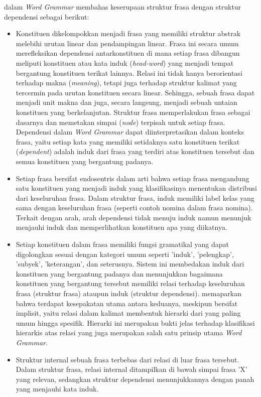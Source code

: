 \cite{hudson2010introduction} dalam \textit{Word Grammar} membahas keserupaan struktur frasa dengan struktur dependensi sebagai berikut:
\begin{itemize}
\item Konstituen dikelompokkan menjadi frasa yang memiliki struktur abstrak melebihi urutan linear dan pendampingan linear. Frasa ini secara umum merefleksikan dependensi antarkonstituen di mana setiap frasa dibangun meliputi konstituen atau kata induk (\textit{head-word}) yang menjadi tempat bergantung konstituen terikat lainnya. Relasi ini tidak hanya berorientasi terhadap makna (\textit{meaning}), tetapi juga terhadap struktur kalimat yang tercermin pada urutan konstituen secara linear. Sehingga, sebuah frasa dapat menjadi unit makna dan juga, secara langsung, menjadi sebuah untaian konstituen yang berkelanjutan. Struktur frasa memperlakukan frasa sebagai dasarnya dan memetakan simpai (\textit{node}) terpisah untuk setiap frasa. Dependensi dalam \textit{Word Grammar} dapat diinterpretasikan dalam konteks frasa, yaitu setiap kata yang memiliki setidaknya satu konstituen terikat (\textit{dependent}) adalah induk dari frasa yang terdiri atas konstituen tersebut dan semua konstituen yang bergantung padanya.
\item Setiap frasa bersifat endosentris dalam arti bahwa setiap frasa mengandung satu konstituen yang menjadi induk yang klasifikasinya menentukan distribusi dari keseluruhan frasa. Dalam struktur frasa, induk memiliki label kelas yang sama dengan keseluruhan frasa (seperti contoh nomina dalam frasa nomina). Terkait dengan arah, arah dependensi tidak menuju induk namun menunjuk menjauhi induk dan memperlihatkan konstituen apa yang diikatnya.
\item Setiap konstituen dalam frasa memiliki fungsi gramatikal yang dapat digolongkan sesuai dengan kategori umum seperti 'induk', 'pelengkap', 'subyek', 'keterangan', dan seterusnya. Sistem ini membedakan induk dari konstituen yang bergantung padanya dan menunjukkan bagaimana konstituen yang bergantung tersebut memiliki relasi terhadap keseluruhan frasa (struktur frasa) ataupun induk (struktur dependensi). \cite{hudson2007language} memaparkan bahwa terdapat kesepakatan utama antara keduanya, meskipun bersifat implisit, yaitu relasi dalam kalimat membentuk hierarki dari yang paling umum hingga spesifik. Hierarki ini merupakan bukti jelas terhadap klasifikasi hierarkis atas relasi yang juga merupakan salah satu prinsip utama \textit{Word Grammar}.
\item Struktur internal sebuah frasa terbebas dari relasi di luar frasa tersebut. Dalam struktur frasa, relasi internal ditampilkan di bawah simpai frasa 'X' yang relevan, sedangkan struktur dependensi menunjukkannya dengan panah yang menjauhi kata induk.

\end{itemize}
